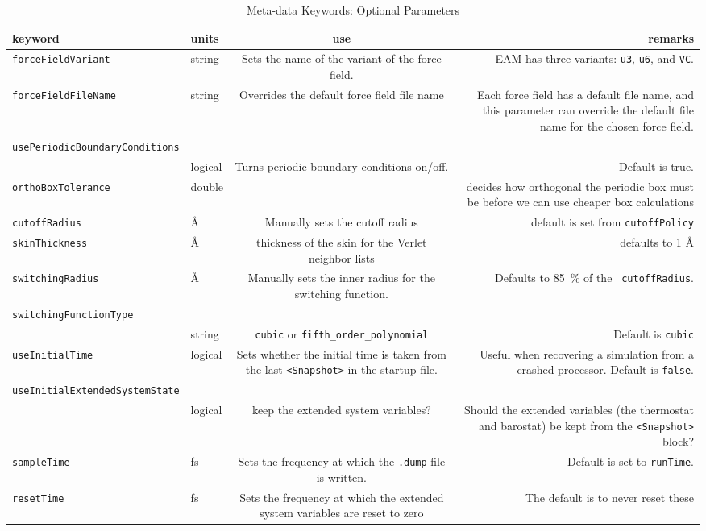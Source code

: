 \documentclass[letterpaper]{report}
\begin{document}
\begin{longtable}[c]{ABCD}
\caption{Meta-data Keywords: Optional Parameters}
\\
{\bf keyword} & {\bf units} & {\bf use} & {\bf remarks}  \\ \hline
\endhead
\hline
\endfoot
{\tt forceFieldVariant} & string & Sets the name of the variant of the
force field.  & EAM has three variants: {\tt u3}, {\tt u6}, and
{\tt VC}. \\
{\tt forceFieldFileName} & string & Overrides the default force field
file name & Each force field has a default file name, and this
parameter can override the default file name for the chosen force
field. \\
{\tt usePeriodicBoundaryConditions} & & & \\
  & logical & Turns periodic boundary conditions on/off. & Default is true. \\
{\tt orthoBoxTolerance} & double & & decides how orthogonal the periodic
box must be before we can use cheaper box calculations \\
{\tt cutoffRadius} & $\mbox{\AA}$ & Manually sets the cutoff radius &
default is set from {\tt cutoffPolicy} \\ 
{\tt skinThickness} & \AA & thickness of the skin for the Verlet
neighbor lists & defaults to 1 \AA \\
{\tt switchingRadius} & $\mbox{\AA}$  & Manually sets the inner radius
for the switching function. & Defaults to 85~\% of the {\tt
cutoffRadius}. \\
{\tt switchingFunctionType} & & & \\
 & string & {\tt cubic} or
{\tt fifth\_order\_polynomial} & Default is {\tt cubic} \\
{\tt useInitialTime} & logical & Sets whether the initial time is
taken from the last {\tt <Snapshot>} in the startup file. & Useful when recovering a simulation from a crashed processor. Default is {\tt false}. \\
{\tt useInitialExtendedSystemState} & & & \\
  & logical & keep the extended
system variables? & Should the extended
variables (the thermostat and barostat) be kept from the {\tt <Snapshot>} block? \\
{\tt sampleTime} & fs & Sets the frequency at which the {\tt .dump} file is written. & Default is set to {\tt runTime}. \\
{\tt resetTime} & fs & Sets the frequency at which the extended system
variables are reset to zero & The default is to never reset these

\end{longtable}
\end{document}
